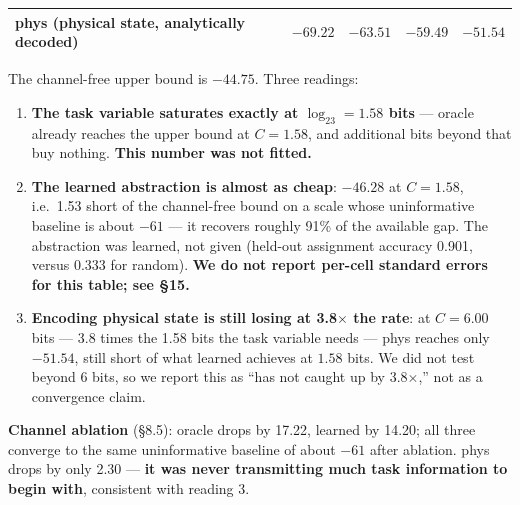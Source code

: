 \documentclass[11pt]{article}
\providecommand{\tightlist}{%
  \setlength{\itemsep}{0pt}\setlength{\parskip}{0pt}}
\begin{document}
\begin{longtable}[]{@{}lllll@{}}
\begin{minipage}[t]{0.17\columnwidth}\raggedright
\textbf{phys} (physical state, analytically decoded)\strut
\end{minipage} & \begin{minipage}[t]{0.17\columnwidth}\raggedright
\(-69.22\)\strut
\end{minipage} & \begin{minipage}[t]{0.17\columnwidth}\raggedright
\(-63.51\)\strut
\end{minipage} & \begin{minipage}[t]{0.17\columnwidth}\raggedright
\(-59.49\)\strut
\end{minipage} & \begin{minipage}[t]{0.17\columnwidth}\raggedright
\(\mathbf{-51.54}\)\strut
\end{minipage}\tabularnewline
\bottomrule
\end{longtable}

The channel-free upper bound is \(-44.75\). Three readings:

\begin{enumerate}
\def\labelenumi{\arabic{enumi}.}
\tightlist
\item
  \textbf{The task variable saturates exactly at \(\log_23=1.58\) bits} --- oracle already reaches the upper bound at \(C=1.58\), and additional bits beyond that buy nothing. \textbf{This number was not fitted.}
\item
  \textbf{The learned abstraction is almost as cheap}: \(-46.28\) at \(C=1.58\), i.e.~1.53 short of the channel-free bound on a scale whose uninformative baseline is about \(-61\) --- it recovers roughly 91\% of the available gap. The abstraction was learned, not given (held-out assignment accuracy 0.901, versus 0.333 for random). \textbf{We do not report per-cell standard errors for this table; see \S{}15.}
\item
  \textbf{Encoding physical state is still losing at 3.8\(\times\) the rate}: at \(C=6.00\) bits --- 3.8 times the 1.58 bits the task variable needs --- phys reaches only \(-51.54\), still short of what learned achieves at \(1.58\) bits. We did not test beyond 6 bits, so we report this as ``has not caught up by 3.8\(\times\),'' not as a convergence claim.
\end{enumerate}

\textbf{Channel ablation} (\S{}8.5): oracle drops by 17.22, learned by 14.20; all three converge to the same uninformative baseline of about \(-61\) after ablation. phys drops by only 2.30 --- \textbf{it was never transmitting much task information to begin with}, consistent with reading 3.
\end{document}
